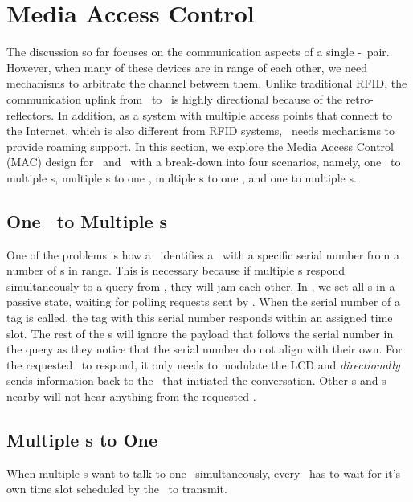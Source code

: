\section{Media Access Control}
\label{sec:mac}

The discussion so far focuses on the communication aspects of a single \vitag-\reader\ pair. However, when many of these devices are in range of each other, we need mechanisms to arbitrate the channel between them. Unlike traditional RFID, the communication uplink from \vitag\ to \reader\ is highly directional because of the retro-reflectors. In addition, as a system with multiple access points that connect to the Internet, which is also different from RFID systems, \vitag\ needs mechanisms to provide roaming support. In this section, we explore the Media Access Control (MAC) design for \vitag\ and \reader\ with a break-down into four scenarios, namely, one \reader\ to multiple \vitag\/s, multiple \vitag\/s to one \reader, multiple \reader\/s to one \vitag, and one \vitag to multiple \reader\/s.

\subsection{One \reader\ to Multiple \vitag\/s}
\label{subsec:onereaderto}
One of the problems is how a \reader\ identifies a \vitag\ with a specific serial number from a number of \vitag\/s in range. This is necessary because if multiple \vitag\/s respond simultaneously to a query from \reader, they will jam each other. In \vitag, we set all \vitag\/s in a passive state, waiting for polling requests sent by \reader. When the serial number of a tag is called, the tag with this serial number responds within an assigned time slot. The rest of the \vitag\/s will ignore the payload that follows the serial number in the query as they notice that the serial number do not align with their own. For the requested \vitag\ to respond, it only needs to modulate the LCD and \textit{directionally} sends information back to the \reader\ that initiated the conversation. Other \vitag\/s and \reader\/s nearby will not hear anything from the requested \vitag.

\subsection{Multiple \vitag\/s to One \reader}
\label{subsec:multitagto}
When multiple \vitag\/s want to talk to one \reader\ simultaneously, every \vitag\ has to wait for it's own time slot scheduled by the \reader\ to transmit.

